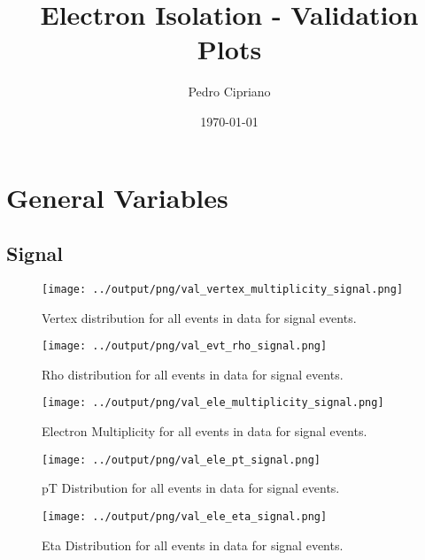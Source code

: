 \documentclass[11pt]{book}
\begin{document}
         
 
 \author{Pedro Cipriano}
 \date{\today}
 \title{Electron Isolation - Validation Plots}

\maketitle

\tableofcontents

\chapter{General Variables}
\section{Signal}

\begin{figure}[htb]
\centering
\texttt{[image: ../output/png/val\_vertex\_multiplicity\_signal.png]}
\caption{Vertex distribution for all events in data for signal events.}
\label{fig:val_vertex_multiplicity_signal}
\end{figure}

\begin{figure}[htb]
\centering
\texttt{[image: ../output/png/val\_evt\_rho\_signal.png]}
\caption{Rho distribution for all events in data for signal events.}
\label{fig:val_evt_rho_signal}
\end{figure}

\begin{figure}[htb]
\centering
\texttt{[image: ../output/png/val\_ele\_multiplicity\_signal.png]}
\caption{Electron Multiplicity for all events in data for signal events.}
\label{fig:val_ele_multiplicity_signal}
\end{figure}

\begin{figure}[htb]
\centering
\texttt{[image: ../output/png/val\_ele\_pt\_signal.png]}
\caption{pT Distribution for all events in data for signal events.}
\label{fig:val_ele_pt_signal}
\end{figure}

\begin{figure}[htb]
\centering
\texttt{[image: ../output/png/val\_ele\_eta\_signal.png]}
\caption{Eta Distribution for all events in data for signal events.}
\label{fig:val_ele_eta_signal}
\end{figure}
\cleapage
\end{document}
